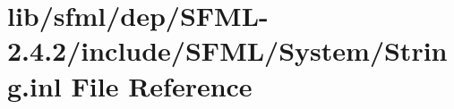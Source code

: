 \hypertarget{sfml_2dep_2_s_f_m_l-2_84_82_2include_2_s_f_m_l_2_system_2_string_8inl}{\section{lib/sfml/dep/\-S\-F\-M\-L-\/2.4.2/include/\-S\-F\-M\-L/\-System/\-String.inl File Reference}
\label{sfml_2dep_2_s_f_m_l-2_84_82_2include_2_s_f_m_l_2_system_2_string_8inl}
}

